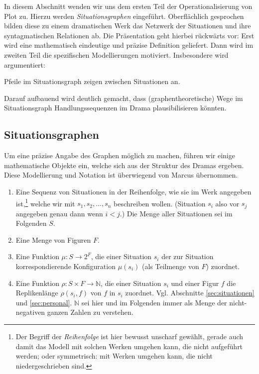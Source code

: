 \documentclass[a4paper,10pt,abstract=true,headings=small]{scrartcl}
\begin{document}
In diesem Abschnitt wenden wir uns dem ersten Teil der Operationalisierung von Plot zu.
Hierzu werden \emph{Situationsgraphen} eingeführt.
Oberflächlich gesprochen bilden diese zu einem dramatischen Werk das Netzwerk der Situationen und ihre syntagmatischen Relationen ab.
Die Präsentation geht hierbei rückwärts vor: Erst wird eine mathematisch eindeutige und präzise Definition geliefert.
Dann wird im zweiten Teil die spezifischen Modellierungen motiviert.
Insbesondere wird argumentiert:
\begin{enumerate*}
    \item Pfeile im Situationsgraph zeigen  zwischen Situationen an.
    \item Darauf aufbauend wird deutlich gemacht, dass (graphentheoretische) Wege im Situationsgraph Handlungssequenzen im Drama plausibilisieren könnten.
\end{enumerate*}

\subsection{Situationsgraphen}

Um eine präzise Angabe des Graphen möglich zu machen, führen wir einige mathematische Objekte ein, welche sich aus der Struktur des Dramas ergeben.
Diese Modellierung und Notation ist überwiegend von Marcus übernommen\autocite{marcus_mathematisch-linguistisches_1971}.

\begin{enumerate}[nosep] %
    \item Eine Sequenz von Situationen in der Reihenfolge, wie sie im Werk angegeben ist,\footnote{Der Begriff der \emph{Reihenfolge} ist hier bewusst unscharf gewählt, gerade auch damit das Modell mit solchen Werken umgehen kann, die nicht aufgeführt werden; oder symmetrisch: mit Werken umgehen kann, die nicht niedergeschrieben sind.} welche wir mit $s_1, s_2, \dots, s_n$ beschreiben wollen. (Situation $s_i$ also vor $s_j$ angegeben genau dann wenn $i<j$.) Die Menge aller Situationen sei im Folgenden $S$.
    \item Eine Menge von Figuren $F$.
    \item Eine Funktion $\mu\colon S \to 2^F$, die einer Situation $s_i$ der zur Situation korrespondierende Konfiguration $\mu(s_i)$ (als Teilmenge von $F$) zuordnet.
    \item Eine Funktion $\rho\colon S\times F \to \mathbb{N}$, die einer Situation $s_i$ und einer Figur $f$ die Replikenlänge $\rho(s_i, f)$ von $f$ in $s_i$ zuordnet.
        Vgl. Abschnitte \ref{sec:situationen} und \ref{sec:personal}.
        $\mathbb{N}$ sei hier und im Folgenden immer als Menge der nicht-negativen ganzen Zahlen zu verstehen.
\end{enumerate}
\end{document}
